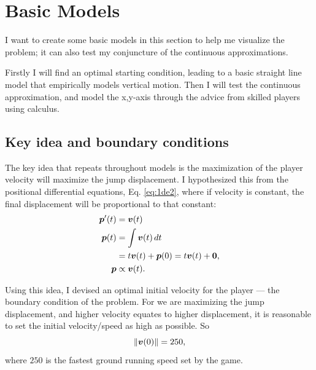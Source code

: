 
\section{Basic Models}
I want to create some basic models in this section to help me visualize the problem; it can also test my conjuncture of the continuous approximations.

Firstly I will find an optimal starting condition, leading to a basic straight line model that empirically models vertical motion. Then I will test the continuous approximation, and model the x,y-axis
through the advice from skilled players using calculus.

\subsection{Key idea and boundary conditions}
The key idea that repeats throughout models is the maximization of the player velocity will maximize the jump displacement. I hypothesized this from the positional differential equations, Eq. \ref{eq:1de2}, where if velocity is constant, the final displacement will be proportional to that constant:
\begin{align*}
    \boldsymbol{p}'(t) &= \boldsymbol{v}(t)\\
    \boldsymbol{p}(t) &= \int \boldsymbol{v}(t) \, dt\\
    &= t\boldsymbol{v}(t) + \boldsymbol{p}(0) = t\boldsymbol{v}(t) + \boldsymbol{0},\\
    \boldsymbol{p} &\propto \boldsymbol{v}(t).
\end{align*}

Using this idea, I devised an optimal initial velocity for the player --- the boundary condition of the problem. For we are maximizing the jump displacement, and higher velocity equates to higher displacement, it is reasonable to set the initial velocity/speed as high as possible. So
\[
    \|\boldsymbol{v}(0)\| = 250,
\]
where $250$ is the fastest ground running speed set by the game.


